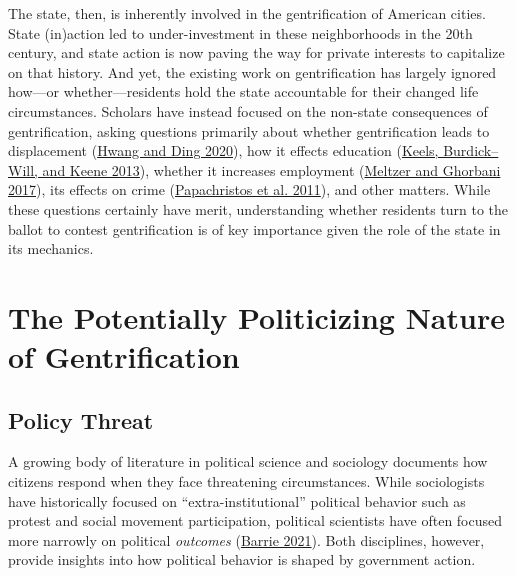 \documentclass[
  12pt,
]{article}
\begin{document}
The state, then, is inherently involved in the gentrification of American cities. State (in)action led to under-investment in these neighborhoods in the 20th century, and state action is now paving the way for private interests to capitalize on that history. And yet, the existing work on gentrification has largely ignored how---or whether---residents hold the state accountable for their changed life circumstances. Scholars have instead focused on the non-state consequences of gentrification, asking questions primarily about whether gentrification leads to displacement (\protect\hyperlink{ref-Hwang2020}{Hwang and Ding 2020}), how it effects education (\protect\hyperlink{ref-Keels2013}{Keels, Burdick--Will, and Keene 2013}), whether it increases employment (\protect\hyperlink{ref-Meltzer2017}{Meltzer and Ghorbani 2017}), its effects on crime (\protect\hyperlink{ref-Papachristos2011}{Papachristos et al. 2011}), and other matters. While these questions certainly have merit, understanding whether residents turn to the ballot to contest gentrification is of key importance given the role of the state in its mechanics.

\hypertarget{the-potentially-politicizing-nature-of-gentrification}{%
\section{The Potentially Politicizing Nature of Gentrification}\label{the-potentially-politicizing-nature-of-gentrification}}

\hypertarget{policy-threat}{%
\subsection{Policy Threat}\label{policy-threat}}

A growing body of literature in political science and sociology documents how citizens respond when they face threatening circumstances. While sociologists have historically focused on ``extra-institutional'' political behavior such as protest and social movement participation, political scientists have often focused more narrowly on political \emph{outcomes} (\protect\hyperlink{ref-Barrie2021}{Barrie 2021}). Both disciplines, however, provide insights into how political behavior is shaped by government action.
\end{document}
